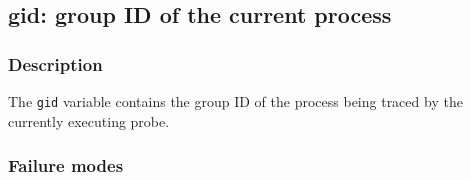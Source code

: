 \clearpage
{}
{}
\label{vars:gid}
\subsection*{gid: group ID of the current process}

\subsubsection*{Description}

The \verb|gid| variable contains the group ID of the process being
traced by the currently executing probe.

\subsubsection*{Failure modes}


